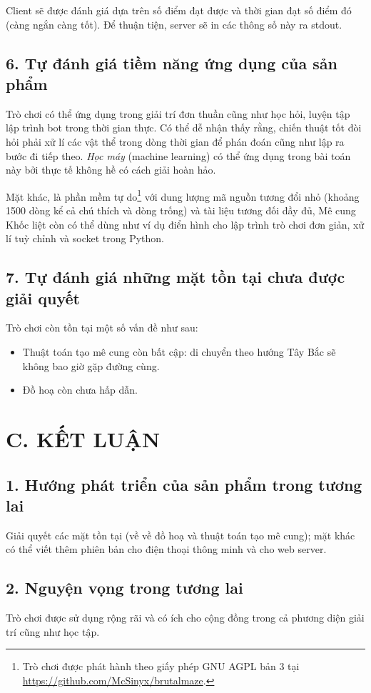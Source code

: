 \documentclass[a4paper,11pt]{article}
\begin{document}
Client sẽ được đánh giá dựa trên số điểm đạt được và thời gian đạt số điểm đó
(càng ngắn càng tốt). Để thuận tiện, server sẽ in các thông số này ra stdout.

\subsection*{6. Tự đánh giá tiềm năng ứng dụng của sản phẩm}
Trò chơi có thể ứng dụng trong giải trí đơn thuần cũng như học hỏi, luyện tập
lập trình bot trong thời gian thực. Có thể dễ nhận thấy rằng, chiến thuật tốt
đòi hỏi phải xử lí các vật thể trong dòng thời gian để phán đoán cũng như lập ra
bước đi tiếp theo. \emph{Học máy} (machine learning) có thể ứng dụng trong bài
toán này bởi thực tế không hề có cách giải hoàn hảo.

Mặt khác, là phần mềm tự do\footnote{Trò chơi được phát hành theo giấy phép GNU
AGPL bản 3 tại \url{https://github.com/McSinyx/brutalmaze}.} với dung
lượng mã nguồn tương đổi nhỏ (khoảng 1500 dòng kể cả chú thích và dòng trống) và
tài liệu tương đối đầy đủ, Mê cung Khốc liệt còn có thể dùng như ví dụ điển hình
cho lập trình trò chơi đơn giản, xử lí tuỳ chỉnh và socket trong Python.

\subsection*{7. Tự đánh giá những mặt tồn tại chưa được giải quyết}
Trò chơi còn tồn tại một số vấn đề như sau:
\begin{itemize}
  \item Thuật toán tạo mê cung còn bất cập: di chuyển theo hướng Tây Bắc sẽ
    không bao giờ gặp đường cùng.~\cite{algo}
  \item Đồ hoạ còn chưa hấp dẫn.
\end{itemize}

\section*{C. KẾT LUẬN}
\subsection*{1. Hướng phát triển của sản phẩm trong tương lai}
Giải quyết các mặt tồn tại (về về đồ hoạ và thuật toán tạo mê cung); mặt khác có
thể viết thêm phiên bản cho điện thoại thông minh và cho web server.
\subsection*{2. Nguyện vọng trong tương lai}
Trò chơi được sử dụng rộng rãi và có ích cho cộng đồng trong cả phương diện giải
trí cũng như học tập.
\end{document}
